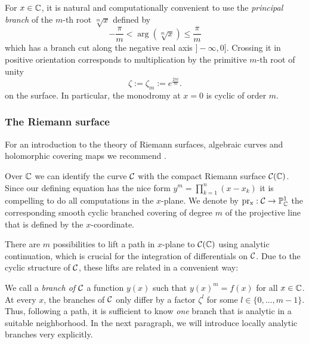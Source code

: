 \documentclass[main.tex]{subfiles}
\begin{document}
  For $x\in\mathbb{C}$, it is natural and computationally convenient to use the
  \emph{principal branch} of the $m$-th root $\sqrt[m]x$ defined by
  \begin{equation*}
      -\frac{π}m<\arg(\sqrt[m]x)\leq\frac{π}m
  \end{equation*}
  which has a branch cut along the negative real axis $]\!-\infty,0]$.
  Crossing it in positive orientation corresponds to multiplication by
  the primitive $m$-th root of unity
  \begin{equation*}
  \zeta := \zeta_m := e^{\frac{2\pi i }{m}}.
  \end{equation*}
  on the surface.
  In particular, the monodromy at $x=0$ is cyclic of order $m$.

  \subsubsection{The Riemann surface}\label{subsec:riemann_surface}

  For an introduction to the theory of Riemann surfaces, algebraic curves and holomorphic covering maps we recommend \cite{Miranda1995}.

   Over $\mathbb{C}$ we can identify the curve $\mathcal{C}$ with the compact Riemann surface $\mathcal{C}(\mathbb{C})$. Since our defining equation
   has the nice form
   $y^m = \prod_{k = 1}^n (x - x_k)$ it is compelling to do all computations in the $x$-plane.
   We denote by $\operatorname{pr_x} : \mathcal{C} \rightarrow \mathbb{P}^1_{\mathbb{C}}$ the corresponding smooth cyclic branched covering of degree $m$ 
   of the projective line that is
   defined by the $x$-coordinate.

  There
  are $m$ possibilities to lift a path in $x$-plane to $\mathcal{C}(\mathbb{C})$ using analytic continuation, which
  is crucial for the integration
  of differentials on $\mathcal{C}$. Due to the cyclic structure of $\mathcal{C}$, these lifts are related in a convenient way:

  We call a \emph{branch of $\mathcal{C}$} a function $y(x)$ such that
  $y(x)^m = f(x)$ for all $x \in \mathbb{C}$. At every $x$, the branches of $\mathcal{C}$ only
  differ by a factor $\zeta^l$ for some $l \in \{0,\dots,m-1\}$. Thus, following a path, it is sufficient to know \emph{one} branch that is analytic in a suitable neighborhood. In the
  next paragraph, we will introduce locally analytic branches very explicitly.
\end{document}
